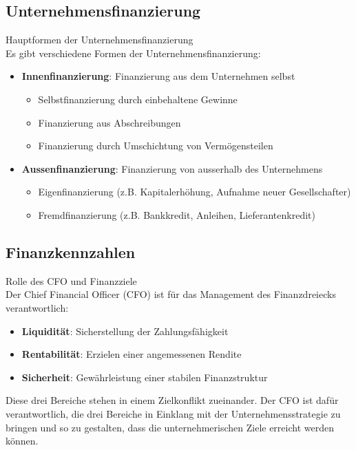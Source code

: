 \subsection{Unternehmensfinanzierung}

\begin{definition}{Hauptformen der Unternehmensfinanzierung}\\
Es gibt verschiedene Formen der Unternehmensfinanzierung:
\begin{itemize}
    \item \textbf{Innenfinanzierung}: Finanzierung aus dem Unternehmen selbst
    \begin{itemize}
        \item Selbstfinanzierung durch einbehaltene Gewinne
        \item Finanzierung aus Abschreibungen
        \item Finanzierung durch Umschichtung von Vermögensteilen
    \end{itemize}
    \item \textbf{Aussenfinanzierung}: Finanzierung von ausserhalb des Unternehmens
    \begin{itemize}
        \item Eigenfinanzierung (z.B. Kapitalerhöhung, Aufnahme neuer Gesellschafter)
        \item Fremdfinanzierung (z.B. Bankkredit, Anleihen, Lieferantenkredit)
    \end{itemize}
\end{itemize}
\end{definition}

\subsection{Finanzkennzahlen}

\begin{concept}{Rolle des CFO und Finanzziele}\\
Der Chief Financial Officer (CFO) ist für das Management des Finanzdreiecks verantwortlich:
\begin{itemize}
    \item \textbf{Liquidität}: Sicherstellung der Zahlungsfähigkeit
    \item \textbf{Rentabilität}: Erzielen einer angemessenen Rendite
    \item \textbf{Sicherheit}: Gewährleistung einer stabilen Finanzstruktur
\end{itemize}

Diese drei Bereiche stehen in einem Zielkonflikt zueinander. Der CFO ist dafür verantwortlich, die drei Bereiche in Einklang mit der Unternehmensstrategie zu bringen und so zu gestalten, dass die unternehmerischen Ziele erreicht werden können.
\end{concept}

